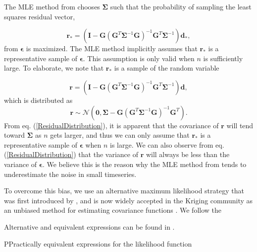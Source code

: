 \documentclass[10pt,a4paper]{article}
\begin{document}
The MLE method from \citet{Langbein1997} chooses $\mathbf{\Sigma}$ such that the probability of sampling the least squares residual vector,

\begin{equation}\label{ResidualRealization}
  \mathbf{r}_* =  \left(\mathbf{I} - \mathbf{G}\left(\mathbf{G}^T\mathbf{\Sigma}^{-1}\mathbf{G}\right)^{-1}\mathbf{G}^T\mathbf{\Sigma}^{-1}\right)\mathbf{d_*},
\end{equation}  
from $\mathbf{\epsilon}$ is maximized. The MLE method implicitly assumes that $\mathbf{r}_*$ is a representative sample of $\mathbf{\epsilon}$. This assumption is only valid when $n$ is sufficiently large. To elaborate, we note that $\mathbf{r_*}$ is a sample of the random variable

\begin{equation}\label{ResidualVariable}
  \mathbf{r} =  \left(\mathbf{I} - \mathbf{G}\left(\mathbf{G}^T\mathbf{\Sigma}^{-1}\mathbf{G}\right)^{-1}\mathbf{G}^T\mathbf{\Sigma}^{-1}\right)\mathbf{d},
\end{equation}  
which is distributed as
\begin{equation}\label{ResidualDistribution}
  \mathbf{r} \sim \mathcal{N}\left(\mathbf{0},\mathbf{\Sigma} - \mathbf{G}\left(\mathbf{G}^T\mathbf{\Sigma}^{-1}\mathbf{G}\right)^{-1}\mathbf{G}^T\right).
\end{equation}
From eq. (\ref{ResidualDistribution}), it is apparent that the covariance of $\mathbf{r}$ will tend toward $\mathbf{\Sigma}$ as $n$ gets larger, and thus we can only assume that $\mathbf{r}_*$ is a representative sample of $\mathbf{\epsilon}$ when $n$ is large. We can also observe from eq. (\ref{ResidualDistribution}) that the variance of $\mathbf{r}$ will always be less than the variance of $\mathbf{\epsilon}$.  We believe this is the reason why the MLE method from \citet{Langbein1997} tends to underestimate the noise in small timeseries.

To overcome this bias, we use an alternative maximum likelihood strategy that was first introduced by \citet{Patterson1971}, and is now widely accepted in the Kriging community as an unbiased method for estimating covariance functions \citep[e.g][]{Cressie1992}. We follow the 

Alternative and equivalent expressions can be found in \citet{Wahba1985,Rassmussen2006}.  

   

PPractically equivalent expressions for the likelihood function 
\end{document}
